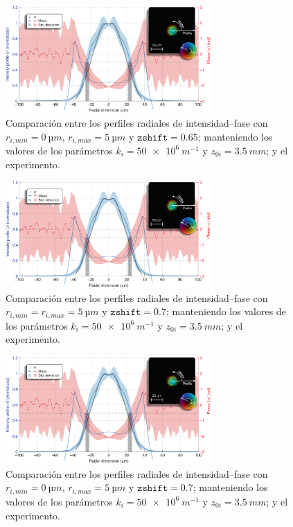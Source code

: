 \begin{figure}[htbp]
  \centering
  \includegraphics[width=0.7\textwidth]{Figuras/anx_cmp_46.png}
  \caption*{Comparación entre los perfiles radiales de intensidad--fase con $r_{i,min}=\qty{0}{µm}$, $r_{i,max}=\qty{5}{µm}$ y $\texttt{zshift}=0.65$; manteniendo los valores de los parámetros $k_{i}=\qty{50e6}{m^{-1}}$ y $z_{0i}=\qty{3.5}{mm}$; y el experimento.}
\end{figure}

\begin{figure}[htbp]
  \centering
  \includegraphics[width=0.7\textwidth]{Figuras/anx_cmp_47.png}
  \caption*{Comparación entre los perfiles radiales de intensidad--fase con $r_{i,min}=r_{i,max}=\qty{5}{µm}$ y $\texttt{zshift}=0.7$; manteniendo los valores de los parámetros $k_{i}=\qty{50e6}{m^{-1}}$ y $z_{0i}=\qty{3.5}{mm}$; y el experimento.}
\end{figure}

\begin{figure}[htbp]
  \centering
  \includegraphics[width=0.7\textwidth]{Figuras/anx_cmp_48.png}
  \caption*{Comparación entre los perfiles radiales de intensidad--fase con $r_{i,min}=\qty{0}{µm}$, $r_{i,max}=\qty{5}{µm}$ y $\texttt{zshift}=0.7$; manteniendo los valores de los parámetros $k_{i}=\qty{50e6}{m^{-1}}$ y $z_{0i}=\qty{3.5}{mm}$; y el experimento.}
\end{figure}


